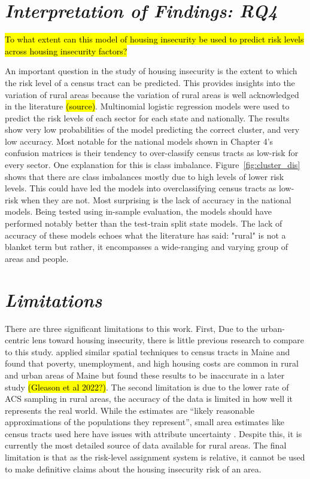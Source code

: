 \section{\textit{Interpretation of Findings: RQ4}}
\hl{To what extent can this model of housing insecurity be used to predict risk levels across housing insecurity factors?}

An important question in the study of housing insecurity is the extent to which the risk level of a census tract can be predicted. This provides insights into the variation of rural areas because the variation of rural areas is well acknowledged in the literature \hl{(source)}. Multinomial logistic regression models were used to predict the risk levels of each sector for each state and nationally. The results show very low probabilities of the model predicting the correct cluster, and very low accuracy. Most notable for the national models shown in Chapter 4's confusion matrices is their tendency to over-classify census tracts as low-risk for every sector. One explanation for this is class imbalance. Figure~\ref{fig:cluster_dis} shows that there are class imbalances mostly due to high levels of lower risk levels. This could have led the models into overclassifying census tracts as low-risk when they are not. Most surprising is the lack of accuracy in the national models. Being tested using in-sample evaluation, the models should have performed notably better than the test-train split state models. The lack of accuracy of these models echoes what the literature has said: "rural" is not a blanket term but rather, it encompasses a wide-ranging and varying group of areas and people. 


\section{\textit{Limitations}}

There are three significant limitations to this work. First, Due to the urban-centric lens toward housing insecurity, there is little previous research to compare to this study. \citet{gleason_using_2021} applied similar spatial techniques to census tracts in Maine and found that poverty, unemployment, and high housing costs are common in rural and urban areas of Maine but found these results to be inaccurate in a later study \hl{(Gleason et al 2022?)}. The second limitation is due to the lower rate of ACS sampling in rural areas, the accuracy of the data is limited in how well it represents the real world. While the estimates are “likely reasonable approximations of the populations they represent”, small area estimates like census tracts used here have issues with attribute uncertainty \citep{spielman_patterns_2014}. Despite this, it is currently the most detailed source of data available for rural areas. The final limitation is that as the risk-level assignment system is relative, it cannot be used to make definitive claims about the housing insecurity risk of an area.  



\endinput